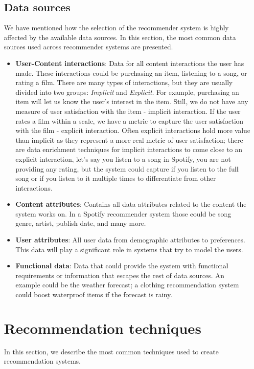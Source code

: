 \documentclass{kththesis}
\begin{document}
\subsection{Data sources}

We have mentioned how the selection of the recommender system is highly affected by the available data sources. In this section, the most common data sources used across recommender systems are presented.

\begin{itemize}
    \item \textbf{User-Content interactions}: Data for all content interactions the user has made. These interactions could be purchasing an item, listening to a song, or rating a film. There are many types of interactions, but they are usually divided into two groups: \textit{Implicit} and \textit{Explicit}. For example, purchasing an item will let us know the user's interest in the item. Still, we do not have any measure of user satisfaction with the item - implicit interaction. If the user rates a film within a scale, we have a metric to capture the user satisfaction with the film - explicit interaction. Often explicit interactions hold more value than implicit as they represent a more real metric of user satisfaction; there are data enrichment techniques for implicit interactions to come close to an explicit interaction, let's say you listen to a song in Spotify, you are not providing any rating, but the system could capture if you listen to the full song or if you listen to it multiple times to differentiate from other interactions.
    \item \textbf{Content attributes}: Contains all data attributes related to the content the system works on. In a Spotify recommender system those could be song genre, artist, publish date, and many more.
    \item \textbf{User attributes}: All user data from demographic attributes to preferences. This data will play a significant role in systems that try to model the users.
    \item \textbf{Functional data}: Data that could provide the system with functional requirements or information that escapes the rest of data sources. An example could be the weather forecast; a clothing recommendation system could boost waterproof items if the forecast is rainy.
\end{itemize}

\section{Recommendation techniques}
In this section, we describe the most common techniques used to create recommendation systems.
\end{document}
